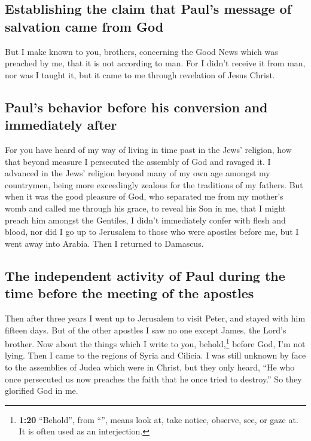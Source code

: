 \hypertarget{establishing-the-claim-that-pauls-message-of-salvation-came-from-god}{%
\subsection{Establishing the claim that Paul's message of salvation came
from
God}\label{establishing-the-claim-that-pauls-message-of-salvation-came-from-god}}

 But I make known to you, brothers, concerning the Good
News which was preached by me, that it is not according to man.
 For I didn't receive it from man, nor was I taught it,
but it came to me through revelation of Jesus Christ.

\hypertarget{pauls-behavior-before-his-conversion-and-immediately-after}{%
\subsection{Paul's behavior before his conversion and immediately
after}\label{pauls-behavior-before-his-conversion-and-immediately-after}}

 For you have heard of my way of living in time past in
the Jews' religion, how that beyond measure I persecuted the assembly of
God and ravaged it.  I advanced in the Jews' religion
beyond many of my own age amongst my countrymen, being more exceedingly
zealous for the traditions of my fathers.  But when it
was the good pleasure of God, who separated me from my mother's womb and
called me through his grace,  to reveal his Son in me,
that I might preach him amongst the Gentiles, I didn't immediately
confer with flesh and blood,  nor did I go up to
Jerusalem to those who were apostles before me, but I went away into
Arabia. Then I returned to Damascus.

\hypertarget{the-independent-activity-of-paul-during-the-time-before-the-meeting-of-the-apostles}{%
\subsection{The independent activity of Paul during the time before the
meeting of the
apostles}\label{the-independent-activity-of-paul-during-the-time-before-the-meeting-of-the-apostles}}

 Then after three years I went up to Jerusalem to visit
Peter, and stayed with him fifteen days.  But of the
other apostles I saw no one except James, the Lord's brother.
 Now about the things which I write to you,
behold,\footnote{\textbf{1:20} ``Behold'', from ``'', means
  look at, take notice, observe, see, or gaze at. It is often used as an
  interjection.} before God, I'm not lying.  Then I came
to the regions of Syria and Cilicia.  I was still unknown
by face to the assemblies of Judea which were in Christ, 
but they only heard, ``He who once persecuted us now preaches the faith
that he once tried to destroy.''  So they glorified God
in me.

